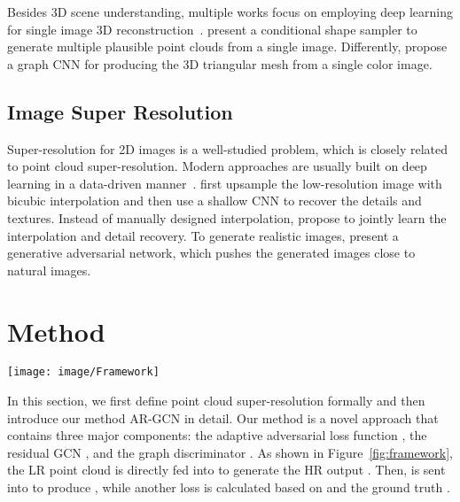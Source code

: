 \documentclass[10pt,twocolumn,letterpaper]{article}
\begin{document}
Besides 3D scene understanding, multiple works focus on employing deep learning for single image 3D reconstruction~\cite{fan2017point,wang2018pixel2mesh,sun2018pix3d,kato2018neural}.
\cite{fan2017point} present a conditional shape sampler to generate multiple plausible point clouds from a single image.
Differently, \cite{wang2018pixel2mesh} propose a graph CNN for producing the 3D triangular mesh from a single color image.

\subsection{Image Super Resolution}
Super-resolution for 2D images is a well-studied problem, which is closely related to point cloud super-resolution.
Modern approaches are usually built on deep learning in a data-driven manner~\cite{dong2014learning, wang2016end, ledig2017photo, zhang2018residual, han2018image, haris2018deep}.
\cite{dong2014learning} first upsample the low-resolution image with bicubic interpolation and then use a shallow CNN to recover the details and textures.
Instead of manually designed interpolation, \cite{wang2016end} propose to jointly learn the interpolation and detail recovery.
To generate realistic images, \cite{ledig2017photo} present a generative adversarial network, which pushes the generated images close to natural images.

\section{Method}
\begin{figure*}
\begin{center}
    \texttt{[image: image/Framework]}
\end{center}
	\vspace{-1.5em}
	\caption{\textbf{Framework Overview.} The proposed AR-GCN consists of a generator  and a discriminator .  is a residual GCN that upsamples the input point cloud progressively with the upsampling ratio .  is also a residual GCN, which learns to distinguish fake HR point cloud from the real one.}
	\vspace{-1em}
	\label{fig:framework}
\end{figure*}

In this section, we first define point cloud super-resolution formally and then introduce our method AR-GCN in detail.
Our method is a novel approach that contains three major components: the adaptive adversarial loss function , the residual GCN , and the graph discriminator .
As shown in Figure~\ref{fig:framework}, the LR point cloud  is directly fed into  to generate the HR output .
Then,  is sent into  to produce , while another loss  is calculated based on  and the ground truth .
\end{document}
